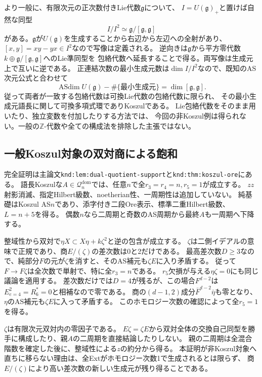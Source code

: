 \documentclass[11pt,a4paper]{ltjsarticle}
\begin{document}
より一般に、有限次元の正次数付きLie代数$\mathfrak g$について、
$I=U(\mathfrak g)_+$と置けば自然な同型
\[
 I/I^2\simeq\mathfrak g/[\mathfrak g,\mathfrak g]
\]
がある。$\mathfrak g$が$U(\mathfrak g)$を生成することから右辺から左辺への全射があり、
$[x,y]=xy-yx\in I^2$なので写像は定義される。
逆向きは$\mathfrak g$から平方零代数
$k\oplus\mathfrak g/[\mathfrak g,\mathfrak g]$へのLie準同型を
包絡代数へ延長することで得る。両写像は生成元上で互いに逆である。
正連結次数の最小生成元数は$\dim I/I^2$なので、既知のAS次元公式と合わせて
\[
 \operatorname{ASdim}U(\mathfrak g)
 -\#\{\text{最小生成元}\}
 =\dim[\mathfrak g,\mathfrak g].
\]
従って両者が一致する包絡代数は可換Lie代数の包絡代数に限られ、
その最小生成元語長に関して可換多項式環でありKoszulである。
Lie包絡代数をそのまま用いたり、独立変数を付加したりする方法では、
今回の非Koszul例は得られない。一般の$\mathbb Z$-代数や全ての構成法を排除した主張ではない。

\subsection{一般Koszul対象の双対商による飽和}
\label{note:koszul-dual-saturation}
完全証明は主論文\texttt{knd:lem:dual-quotient-support}と\texttt{knd:thm:koszul-ore}にある。
語長Koszulな$A\in\mathcal Q_n^{\mathrm{dom}}$では、任意$n$で全$r_3=r_4=n,r_5=1$が成立する。
$zz$射影消滅、指定Hilbert級数、noetherian性、一周期性は追加していない。
純基礎はKoszul AS$n$であり、添字付き二段Ore表示、標準二重Hilbert級数、$L=n+5$を得る。
偶数$n$なら二周期と奇数のAS周期から最終$A$も一周期へ下降する。

整域性から双対で$\eta X\subset X\eta+k\zeta^2$と逆の包含が成立する。
$\zeta$は二側イデアルの意味で正規であり、商$E/(\zeta)$の差次数は0と2だけである。
最高差次数$D\ge3$なので、純部分$F$の元が$\zeta$を消すと、そのAS補元も$\zeta E$に入り矛盾する。
従って$F\to F\zeta$は全次数で単射で、特に全$r_3=n$である。
$r_5$欠損が与える$\eta\zeta=0$にも同じ議論を適用する。
差次数だけでは$D=4$が残るが、この場合$F^{d-2}$は$E^2_{e=4}=R_6^*=0$と相補なので零である。
商の$(d-1,2)$成分$\bar F^{d-2}\bar\eta$も零となり、$\eta$のAS補元も$\zeta E$に入って矛盾する。
このホモロジー次数の確認によって全$r_5=1$を得る。

$\zeta$は有限次元双対内の零因子である。
$E\zeta=\zeta E$から双対全体の交換自己同型を勝手に構成したり、親$A$の二周期を直接結論したりしない。
親の二周期は全混合階数を確定した後に、整域性による$z$の約分から得る。
本証明が非Koszul対象へ直ちに移らない理由は、全Extがホモロジー次数1で生成されるとは限らず、
商$E/(\zeta)$により高い差次数の新しい生成元が残り得ることである。
\end{document}
